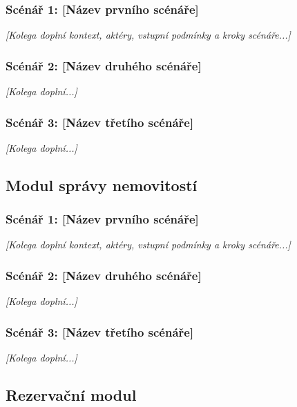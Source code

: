 \documentclass[11pt, a4paper]{article}
\begin{document}
\subsubsection{Scénář 1: [Název prvního scénáře]}
\textit{[Kolega doplní kontext, aktéry, vstupní podmínky a kroky scénáře...]}

\subsubsection{Scénář 2: [Název druhého scénáře]}
\textit{[Kolega doplní...]}

\subsubsection{Scénář 3: [Název třetího scénáře]}
\textit{[Kolega doplní...]}


\vspace{1cm}
\subsection{Modul správy nemovitostí}

\subsubsection{Scénář 1: [Název prvního scénáře]}
\textit{[Kolega doplní kontext, aktéry, vstupní podmínky a kroky scénáře...]}

\subsubsection{Scénář 2: [Název druhého scénáře]}
\textit{[Kolega doplní...]}

\subsubsection{Scénář 3: [Název třetího scénáře]}
\textit{[Kolega doplní...]}


\newpage
\subsection{Rezervační modul}
\end{document}

